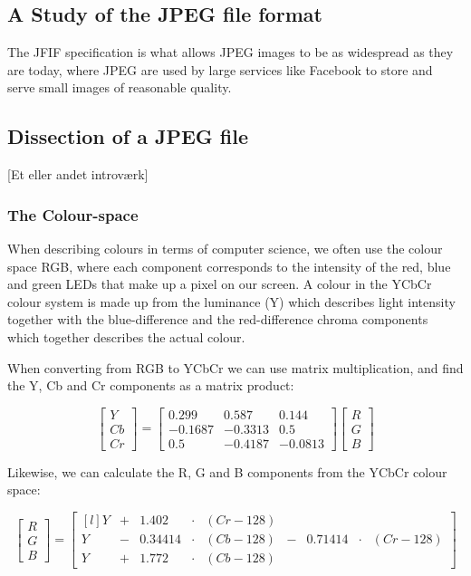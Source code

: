 \begin{infobox}{\section[A Study of the JPEG file format]{A Study of the JPEG file format}}
The JFIF specification is what allows JPEG images to be as widespread as they are today, where JPEG are used by large services like Facebook to store and serve small images of reasonable quality.

\subsection*{Dissection of a JPEG file}
[Et eller andet introværk]
\subsubsection*{The Colour-space}
When describing colours in terms of computer science, we often use the colour space RGB, where each component corresponds to the intensity of the red, blue and green LEDs that make up a pixel on our screen. A colour in the YCbCr colour system is made up from the luminance (Y) which describes light intensity together with the blue-difference and the red-difference chroma components which together describes the actual colour.

When converting from RGB to YCbCr we can use matrix multiplication, and find the Y, Cb and Cr components as a matrix product:

$$\begin{bmatrix}
	Y\\Cb\\Cr
\end{bmatrix} = \begin{bmatrix}
	0.299 & 0.587 & 0.144\\
	-0.1687 & -0.3313 & 0.5\\
	0.5 & -0.4187 & -0.0813
\end{bmatrix}\begin{bmatrix}
	R\\G\\B
\end{bmatrix}$$

Likewise, we can calculate the R, G and B components from the YCbCr colour space:

$$\begin{bmatrix}
	R\\G\\B
\end{bmatrix} = \begin{bmatrix*}[l]
	Y&+&1.402 &\cdot & (Cr-128)&\\
	Y &-& 0.34414&\cdot &(Cb-128) &- &0.71414&\cdot&(Cr-128)\\
	Y &+& 1.772&\cdot& (Cb-128)&
\end{bmatrix*}$$

\end{infobox}
